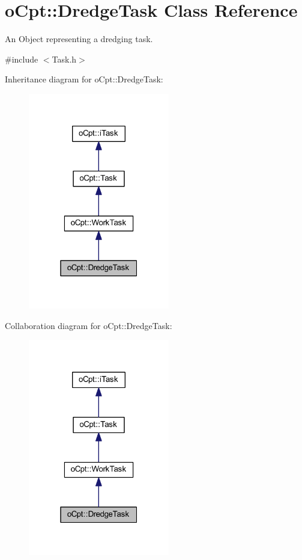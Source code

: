 \hypertarget{classo_cpt_1_1_dredge_task}{}\section{o\+Cpt\+:\+:Dredge\+Task Class Reference}
\label{classo_cpt_1_1_dredge_task}


An Object representing a dredging task.  




{\ttfamily \#include $<$Task.\+h$>$}



Inheritance diagram for o\+Cpt\+:\+:Dredge\+Task\+:\nopagebreak
\begin{figure}[H]
\begin{center}
\leavevmode
\includegraphics[width=175pt]{classo_cpt_1_1_dredge_task__inherit__graph}
\end{center}
\end{figure}


Collaboration diagram for o\+Cpt\+:\+:Dredge\+Task\+:\nopagebreak
\begin{figure}[H]
\begin{center}
\leavevmode
\includegraphics[width=175pt]{classo_cpt_1_1_dredge_task__coll__graph}
\end{center}
\end{figure}
